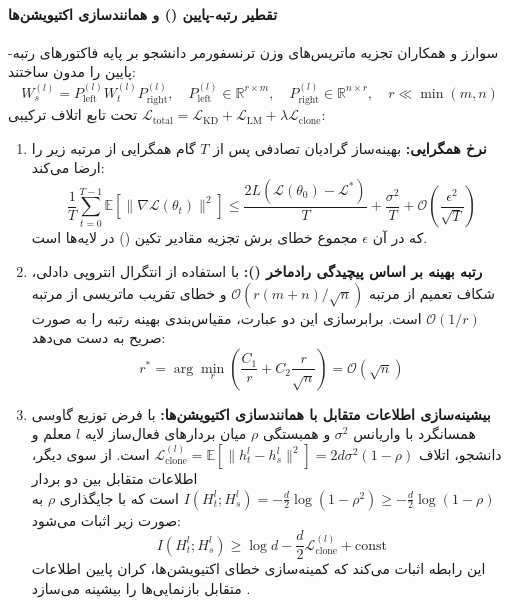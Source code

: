\paragraph*{تقطیر رتبه-پایین () و همانندسازی اکتیویشن‌ها}
سوارز و همکاران \cite{soarez2026demystifying} تجزیه ماتریس‌های وزن ترنسفورمر دانشجو بر پایه فاکتورهای رتبه-پایین را مدون ساختند:
\begin{equation}
    W_s^{(l)} = P_{\text{left}}^{(l)} W_t^{(l)} P_{\text{right}}^{(l)}, \quad P_{\text{left}}^{(l)} \in \mathbb{R}^{r \times m}, \quad P_{\text{right}}^{(l)} \in \mathbb{R}^{n \times r}, \quad r \ll \min(m, n)
\end{equation}
تحت تابع اتلاف ترکیبی $\mathcal{L}_{\text{total}} = \mathcal{L}_{\text{KD}} + \mathcal{L}_{\text{LM}} + \lambda \mathcal{L}_{\text{clone}}$:
\begin{enumerate}
    \item \textbf{نرخ همگرایی:} بهینه‌ساز گرادیان تصادفی پس از $T$ گام همگرایی از مرتبه زیر را ارضا می‌کند:
    \begin{equation}
        \frac{1}{T} \sum_{t=0}^{T-1} \mathbb{E}[\|\nabla \mathcal{L}(\theta_t)\|^2] \le \frac{2L(\mathcal{L}(\theta_0) - \mathcal{L}^*)}{T} + \frac{\sigma^2}{T} + \mathcal{O}\left(\frac{\epsilon^2}{\sqrt{T}}\right)
    \end{equation}
    که در آن $\epsilon$ مجموع خطای برش تجزیه مقادیر تکین () در لایه‌ها است.
    \item \textbf{رتبه بهینه بر اساس پیچیدگی رادماخر ():} با استفاده از انتگرال انتروپی دادلی، شکاف تعمیم از مرتبه $\mathcal{O}(r(m+n)/\sqrt{n})$ و خطای تقریب ماتریسی از مرتبه $\mathcal{O}(1/r)$ است. برابرسازی این دو عبارت، مقیاس‌بندی بهینه رتبه را به صورت صریح به دست می‌دهد:
    \begin{equation}
        r^* = \arg\min_r \left( \frac{C_1}{r} + C_2 \frac{r}{\sqrt{n}} \right) = \mathcal{O}(\sqrt{n})
    \end{equation}
    \item \textbf{بیشینه‌سازی اطلاعات متقابل با همانندسازی اکتیویشن‌ها:} با فرض توزیع گاوسی همسانگرد با واریانس $\sigma^2$ و همبستگی $\rho$ میان بردارهای فعال‌ساز لایه $l$ معلم و دانشجو، اتلاف $\mathcal{L}_{\text{clone}}^{(l)} = \mathbb{E}[\|h_t^l - h_s^l\|^2] = 2d\sigma^2(1 - \rho)$ است. از سوی دیگر، اطلاعات متقابل بین دو بردار $I(H_t^l; H_s^l) = -\frac{d}{2}\log(1-\rho^2) \ge -\frac{d}{2}\log(1-\rho)$ است که با جایگذاری $\rho$ به صورت زیر اثبات می‌شود:
    \begin{equation}
        I(H_t^l; H_s^l) \ge \log d - \frac{d}{2}\mathcal{L}_{\text{clone}}^{(l)} + \text{const}
    \end{equation}
    این رابطه اثبات می‌کند که کمینه‌سازی خطای اکتیویشن‌ها، کران پایین اطلاعات متقابل بازنمایی‌ها را بیشینه می‌سازد \cite{soarez2026demystifying}.
\end{enumerate}

